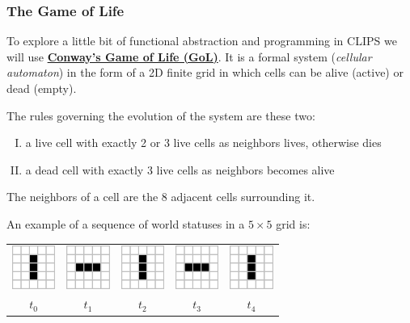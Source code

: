 \documentclass[xcolor={usenames,dvipsnames,svgnames}, compress]{beamer}
\begin{document}
\begin{frame}
  \frametitle{The Game of Life}
  To explore a little bit of functional abstraction and programming in
  CLIPS we will use
  \href{http://en.wikipedia.org/wiki/Conway\%27s_Game_of_Life}{\textbf{Conway's
      Game of Life (GoL)}}. It is a formal system (\emph{cellular
    automaton}) in the form of a 2D finite grid in which cells can be alive
  (active) or dead (empty).\par
  The rules governing the evolution of the system are these two:
  \begin{enumerate}[I.]
  \item a live cell with exactly 2 or 3 live cells as neighbors lives, otherwise
    dies
  \item a dead cell with exactly 3 live cells as neighbors becomes alive
  \end{enumerate}

  The neighbors of a cell are the 8 adjacent cells surrounding
  it.\par\bigskip

  An example of a sequence of world statuses in a $5\times5$ grid is:
  \begin{table}
    \setlength\tabcolsep{2pt}
    \centering
    \tiny
    \begin{tabular}{c c c c c}
      \includegraphics[width=40pt]{Figures/gol-osc-1}
      & \includegraphics[width=40pt]{Figures/gol-osc-2}
      & \includegraphics[width=40pt]{Figures/gol-osc-1}
      & \includegraphics[width=40pt]{Figures/gol-osc-2}
      & \includegraphics[width=40pt]{Figures/gol-osc-1}\\
      
      $t_0$ & $t_1$ & $t_2$& $t_3$ & $t_4$
    \end{tabular}
  \end{table}
\end{frame}
\end{document}

